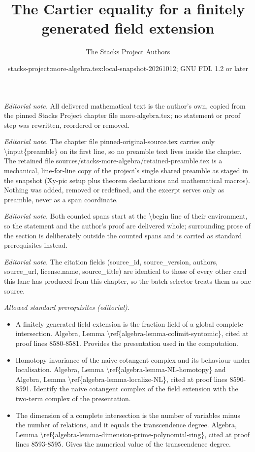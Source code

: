 \documentclass[10pt,a4paper]{amsart}
\title{The Cartier equality for a finitely generated field extension}
\author{The Stacks Project Authors}
\date{stacks-project:more-algebra.tex:local-snapshot-20261012; GNU FDL 1.2 or later}
\theoremstyle{plain}
\theoremstyle{definition}
\theoremstyle{remark}
\numberwithin{equation}{subsection}
\begin{document}
\maketitle
\setcounter{subsection}{1}
\noindent\textit{Editorial note.} All delivered mathematical text is the author's own, copied from the pinned Stacks Project chapter file more-algebra.tex; no statement or proof step was rewritten, reordered or removed.\par\medskip
\noindent\textit{Editorial note.} The chapter file pinned-original-source.tex carries only \textbackslash{}input\{preamble\} on its first line, so no preamble text lives inside the chapter. The retained file sources/stacks-more-algebra/retained-preamble.tex is a mechanical, line-for-line copy of the project's single shared preamble as staged in the snapshot (Xy-pic setup plus theorem declarations and mathematical macros). Nothing was added, removed or redefined, and the excerpt serves only as preamble, never as a span coordinate.\par\medskip
\noindent\textit{Editorial note.} Both counted spans start at the \textbackslash{}begin line of their environment, so the statement and the author's proof are delivered whole; surrounding prose of the section is deliberately outside the counted spans and is carried as standard prerequisites instead.\par\medskip
\noindent\textit{Editorial note.} The citation fields (source\_id, source\_version, authors, source\_url, license.name, source\_title) are identical to those of every other card this lane has produced from this chapter, so the batch selector treats them as one source.\par\medskip
\noindent\textit{Allowed standard prerequisites (editorial).}\begin{itemize}
\item A finitely generated field extension is the fraction field of a global complete intersection. Algebra, Lemma \textbackslash{}ref\{algebra-lemma-colimit-syntomic\}, cited at proof lines 8580-8581. Provides the presentation used in the computation.
\item Homotopy invariance of the naive cotangent complex and its behaviour under localisation. Algebra, Lemma \textbackslash{}ref\{algebra-lemma-NL-homotopy\} and Algebra, Lemma \textbackslash{}ref\{algebra-lemma-localize-NL\}, cited at proof lines 8590-8591. Identify the naive cotangent complex of the field extension with the two-term complex of the presentation.
\item The dimension of a complete intersection is the number of variables minus the number of relations, and it equals the transcendence degree. Algebra, Lemma \textbackslash{}ref\{algebra-lemma-dimension-prime-polynomial-ring\}, cited at proof lines 8593-8595. Gives the numerical value of the transcendence degree.
\end{itemize}\medskip
\end{document}

